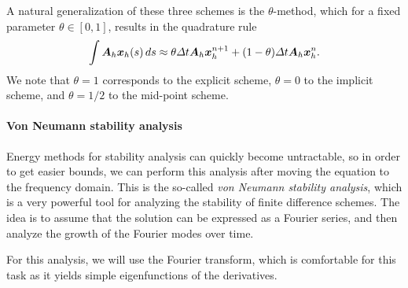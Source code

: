 A natural generalization of these three schemes is the $\theta$-method, which for a fixed parameter $\theta\in[0,1]$, results in the quadrature rule
\begin{equation}
    \int \mat A_h \vec x_h(s)\,ds \approx \theta\Delta t \mat A_h\vec x_h^{n+1} + (1-\theta)\Delta t \mat A_h \vec x_h^n.
\end{equation}
We note that $\theta=1$ corresponds to the explicit scheme, $\theta=0$ to the implicit scheme, and $\theta=1/2$ to the mid-point scheme. 
    
\paragraph{Von Neumann stability analysis}
Energy methods for stability analysis can quickly become untractable, so in order to get easier bounds, we can perform this analysis after moving the equation to the frequency domain. This is the so-called \emph{von Neumann stability analysis}, which is a very powerful tool for analyzing the stability of finite difference schemes. The idea is to assume that the solution can be expressed as a Fourier series, and then analyze the growth of the Fourier modes over time.

For this analysis, we will use the Fourier transform, which is comfortable for this task as it yields simple eigenfunctions of the derivatives. 

